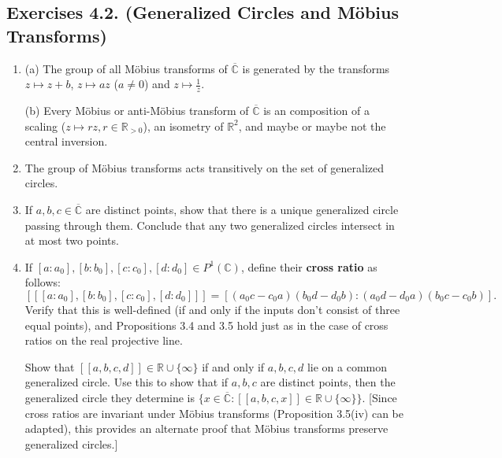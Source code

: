 \documentclass[leqno]{book}
\begin{document}
\subsection*{Exercises 4.2. (Generalized Circles and M\"obius Transforms)} %
\begin{enumerate}
\item (a) The group of all M\"obius transforms of $\overline{\mathbb C}$ is generated by the transforms $z\mapsto z+b$, $z\mapsto az$ ($a\ne 0$) and $z\mapsto\frac 1z$.

(b) Every M\"obius or anti-M\"obius transform of $\overline{\mathbb C}$ is an composition of a scaling ($z\mapsto rz,r\in\mathbb R_{>0}$), an isometry of $\mathbb R^2$, and maybe or maybe not the central inversion.

\item The group of M\"obius transforms acts transitively on the set of generalized circles.

\item If $a,b,c\in\overline{\mathbb C}$ are distinct points, show that there is a unique generalized circle passing through them.  Conclude that any two generalized circles intersect in at most two points.

\item If $[a:a_0],[b:b_0],[c:c_0],[d:d_0]\in P^1(\mathbb C)$, define their \textbf{cross ratio} as follows:
$$[\![[a:a_0],[b:b_0],[c:c_0],[d:d_0]]\!]=[(a_0c-c_0a)(b_0d-d_0b):(a_0d-d_0a)(b_0c-c_0b)].$$
Verify that this is well-defined (if and only if the inputs don't consist of three equal points), and Propositions 3.4 and 3.5 hold just as in the case of cross ratios on the real projective line.

Show that $[\![a,b,c,d]\!]\in\mathbb R\cup\{\infty\}$ if and only if $a,b,c,d$ lie on a common generalized circle.  Use this to show that if $a,b,c$ are distinct points, then the generalized circle they determine is $\{x\in\overline{\mathbb C}:[\![a,b,c,x]\!]\in\mathbb R\cup\{\infty\}\}$.  [Since cross ratios are invariant under M\"obius transforms (Proposition 3.5(iv) can be adapted), this provides an alternate proof that M\"obius transforms preserve generalized circles.]


\end{enumerate}
\end{document}

